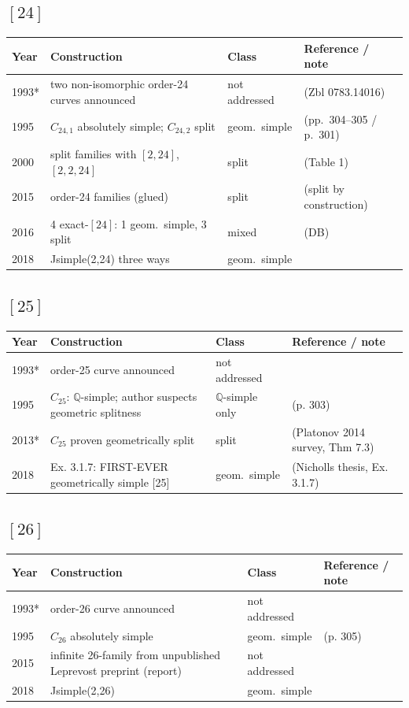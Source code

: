 \documentclass[10pt]{amsart}
\begin{document}
\subsection*{$[24]$}
\begin{longtable}{p{0.9cm} p{7.6cm} p{2.3cm} p{4.2cm}}
\hline Year & Construction & Class & Reference / note \\ \hline
1993* & two non-isomorphic order-24 curves announced & not addressed & \cite{Leprevost1993} (Zbl 0783.14016)\\
1995 & $C_{24,1}$ absolutely simple; $C_{24,2}$ split & geom.\ simple & \cite{Leprevost1995} (pp.\ 304--305 / p.\ 301)\\
2000 & split families with $[2,24]$, $[2,2,24]$ & split & \cite{HLP2000} (Table 1)\\
2015 & order-24 families (glued) & split & \cite{Howe2015} (split by construction)\\
2016 & 4 exact-$[24]$: 1 geom.\ simple, 3 split & mixed & \cite{BSSVY} (DB)\\
2018 & Jsimple(2,24) three ways & geom.\ simple & \cite{Nicholls2018}\\
\hline\end{longtable}
\subsection*{$[25]$}
\begin{longtable}{p{0.9cm} p{7.6cm} p{2.3cm} p{4.2cm}}
\hline Year & Construction & Class & Reference / note \\ \hline
1993* & order-25 curve announced & not addressed & \cite{Leprevost1993}\\
1995 & $C_{25}$: $\mathbb{Q}$-simple; author suspects geometric splitness & $\mathbb{Q}$-simple only & \cite{Leprevost1995} (p. 303)\\
2013* & $C_{25}$ proven geometrically split & split & \cite{PZP2013} (Platonov 2014 survey, Thm 7.3)\\
2018 & Ex. 3.1.7: FIRST-EVER geometrically simple [25] & geom.\ simple & \cite{Nicholls2018} (Nicholls thesis, Ex. 3.1.7)\\
\hline\end{longtable}
\subsection*{$[26]$}
\begin{longtable}{p{0.9cm} p{7.6cm} p{2.3cm} p{4.2cm}}
\hline Year & Construction & Class & Reference / note \\ \hline
1993* & order-26 curve announced & not addressed & \cite{Leprevost1993}\\
1995 & $C_{26}$ absolutely simple & geom.\ simple & \cite{Leprevost1995} (p. 305)\\
2015 & infinite 26-family from unpublished Leprevost preprint (report) & not addressed & \cite{Howe2015}\\
2018 & Jsimple(2,26) & geom.\ simple & \cite{Nicholls2018}\\
\hline\end{longtable}
\end{document}
